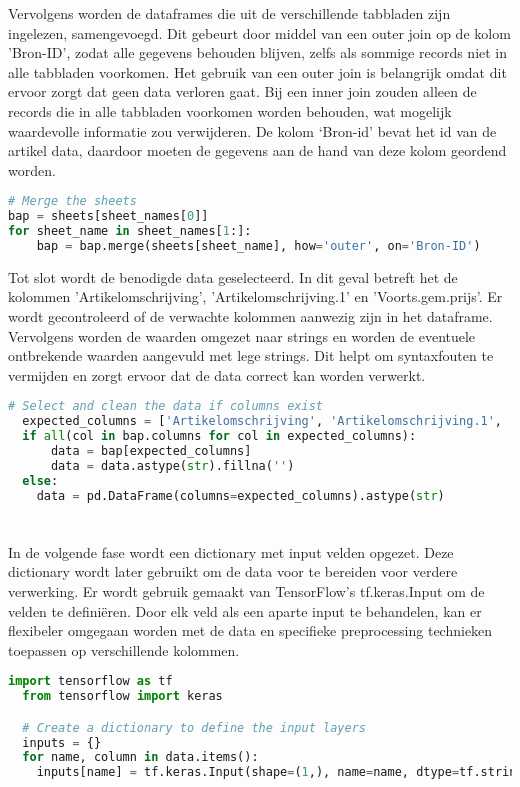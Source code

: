 Vervolgens worden de dataframes die uit de verschillende tabbladen zijn ingelezen, samengevoegd. Dit gebeurt door middel van een outer join op de kolom 'Bron-ID', zodat alle gegevens behouden blijven, zelfs als sommige records niet in alle tabbladen voorkomen. Het gebruik van een outer join is belangrijk omdat dit ervoor zorgt dat geen data verloren gaat. Bij een inner join zouden alleen de records die in alle tabbladen voorkomen worden behouden, wat mogelijk waardevolle informatie zou verwijderen. De kolom ‘Bron-id’ bevat het id van de artikel data, daardoor moeten de gegevens aan de hand van deze kolom geordend worden.
\begin{lstlisting}[language=Python, caption={Het mergen van twee dataframes}]
  # Merge the sheets
bap = sheets[sheet_names[0]]
for sheet_name in sheet_names[1:]:
    bap = bap.merge(sheets[sheet_name], how='outer', on='Bron-ID')
\end{lstlisting}

Tot slot wordt de benodigde data geselecteerd. In dit geval betreft het de kolommen 'Artikelomschrijving', 'Artikelomschrijving.1' en 'Voorts.gem.prijs'. Er wordt gecontroleerd of de verwachte kolommen aanwezig zijn in het dataframe. Vervolgens worden de waarden omgezet naar strings en worden de eventuele ontbrekende waarden aangevuld met lege strings. Dit helpt om syntaxfouten te vermijden en zorgt ervoor dat de data correct kan worden verwerkt.
\begin{lstlisting}[language=Python, caption={Het selecteren en cleanen van de data}]
  # Select and clean the data if columns exist
  expected_columns = ['Artikelomschrijving', 'Artikelomschrijving.1', 'Voorts.gem.prijs']
  if all(col in bap.columns for col in expected_columns):
      data = bap[expected_columns]
      data = data.astype(str).fillna('')
  else:
    data = pd.DataFrame(columns=expected_columns).astype(str)
\end{lstlisting}

\section{}%
\label{sec:inputPreparatiePOC}

In de volgende fase wordt een dictionary met input velden opgezet. Deze dictionary wordt later gebruikt om de data voor te bereiden voor verdere verwerking. Er wordt gebruik gemaakt van TensorFlow's tf.keras.Input om de velden te definiëren. Door elk veld als een aparte input te behandelen, kan er flexibeler omgegaan worden met de data en specifieke preprocessing technieken toepassen op verschillende kolommen.
\begin{lstlisting}[language=Python, caption={Opzetten van een dictionary}]
  import tensorflow as tf
  from tensorflow import keras

  # Create a dictionary to define the input layers
  inputs = {}
  for name, column in data.items():
    inputs[name] = tf.keras.Input(shape=(1,), name=name, dtype=tf.string)
\end{lstlisting}

